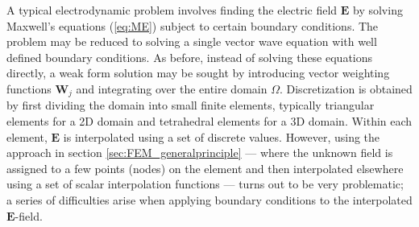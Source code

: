 A typical electrodynamic problem involves finding the electric field $\mathbf{E}$ by solving Maxwell's equations (\ref{eq:ME}) subject to certain boundary conditions. The problem may be reduced to solving a single vector wave equation with well defined boundary conditions. As before, instead of solving these equations directly, a weak form solution may be sought by introducing vector weighting functions $\mathbf{W}_j$ and integrating over the entire domain $\Omega$. Discretization is obtained by first dividing the domain into small finite elements, typically triangular elements for a 2D domain and tetrahedral elements for a 3D domain. Within each element, $\mathbf{E}$ is interpolated using a set of discrete values. However, using the approach in section \ref{sec:FEM_generalprinciple} --- where the unknown field is assigned to a few points (nodes) on the element and then interpolated elsewhere using a set of scalar interpolation functions --- turns out to be very problematic; a series of difficulties arise when applying boundary conditions to the interpolated $\mathbf{E}$-field\cite{FEM_in_EM_jianming_jin}\cite{FEM_TheoryAndCompOfEM_Jian-Ming_Jin}. 



